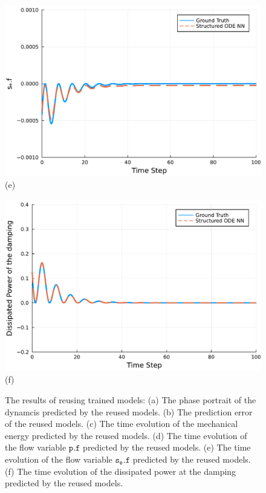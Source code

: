 \documentclass[
	parskip, 			   %
	twoside, 			   %
	DIV=14, 			   %
	BCOR=15.0mm, 		   %
	headsepline, 		   %
	open=right, 		   %
	captions=tableheading, %
	bibliography=totoc,    %
	numbers=noenddot       %
]{scrreprt}
\begin{document}
\begin{figure}[h!]
\begin{minipage}{.3\textwidth}
    \includegraphics[width=1\linewidth]{figures/se.f_compositional_idho_reuse.pdf}
    \\(e)
    \end{minipage}%
    \begin{minipage}{.3\textwidth}
    \centering
    \includegraphics[width=1\linewidth]{figures/dissipated_power_damping_idho_reuse.pdf}
    \\(f)
    \end{minipage}
    \label{fig:idho_reuse}
    \caption{The results of reusing trained models: (a) The phase portrait of the dynamcis predicted by the reused models. (b) The prediction error of the reused models. (c) The time evolution of the mechanical energy predicted by the reused models. (d) The time evolution of the flow variable $\mathtt{p.f}$ predicted by the reused models. (e) The time evolution of the flow variable $\mathtt{s_e.f}$ predicted by the reused models. (f) The time evolution of the dissipated power at the damping predicted by the reused models.}
\end{figure}
\end{document}
